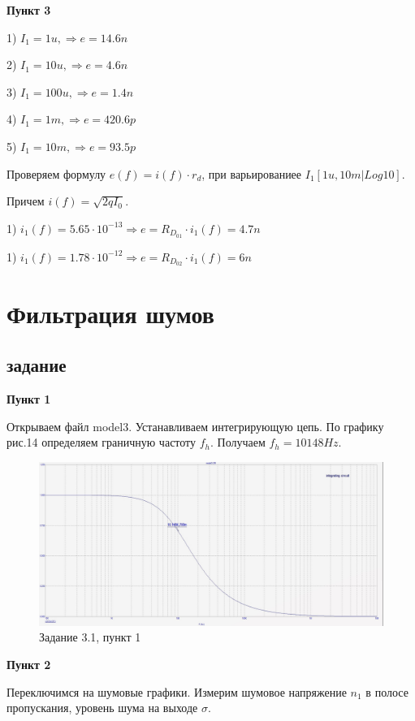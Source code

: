 \documentclass[a4paper, 14pt]{extarticle}%
\begin{document}
\textbf{Пункт 3}

1) $I_1 = 1u, \Rightarrow e = 14.6n$

2) $I_1 = 10u, \Rightarrow e = 4.6n $

3) $I_1 = 100u , \Rightarrow  e = 1.4n $

4) $I_1 = 1m , \Rightarrow e = 420.6p$

5) $I_1 = 10m,  \Rightarrow e = 93.5p$

Проверяем формулу $e(f) = i(f)\cdot r_d$, при варьированиее $I_1[1u, 10m | Log10] $.

Причем $i(f) = \sqrt{2qI_0}$.

1) $i_1(f) = 5.65\cdot 10^{-13} \Rightarrow e = R_{D_{01}} \cdot i_1(f)  = 4.7n$

1) $i_1(f) = 1.78\cdot 10^{-12} \Rightarrow e = R_{D_{02}} \cdot i_1(f) = 6n$





\newpage

\section{Фильтрация шумов}
\subsection{задание}
\textbf{Пункт 1}


Открываем файл model3.
Устанавливаем интегрирующую цепь.
По графику рис.14 определяем граничную частоту $f_h$.
Получаем $f_h = 10148 Hz$.


\begin{figure}[h!]
			\centering
			\includegraphics[width=1.1\linewidth]{3/3_1_1.jpg}
			\caption{Задание 3.1, пункт 1}
			\label{A}
\end{figure}

\textbf{Пункт 2}


Переключимся на шумовые графики. Измерим шумовое напряжение $n_1$ в полосе пропускания, уровень шума на выходе $\sigma$.
\end{document}
